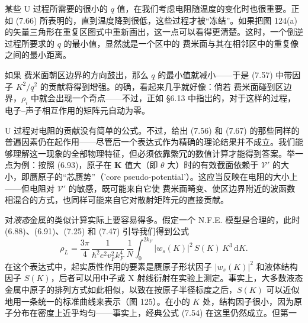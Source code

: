 某些 U 过程所需要的很小的 $q$ 值，在我们考虑电阻随温度的变化时也很重要。正如 (7.66) 所表明的，直到温度降到很低，这些过程才被“冻结”。如果把图 124(a) 的矢量三角形在重复区图式中重新画出，这一点可以看得更清楚。这时，一个倒逆过程所要求的 $q$ 的最小值，显然就是一个区中的 费米面与其在相邻区中的重复像之间的最小距离。


如果 费米面朝区边界的方向鼓出，那么 $q$ 的最小值就减小——于是 (7.57) 中带因子 $K^{2}/q^{2}$ 的贡献将得到增强。的确，看起来几乎就好像：倘若 费米面碰到区边界，$\rho_{i}$ 中就会出现一个奇点——不过，正如 §6.13 中指出的，对于这样的过程，电子--声子相互作用的矩阵元自动为零。

U 过程对电阻的贡献没有简单的公式。不过，给出 (7.56) 和 (7.67) 的那些同样的普遍因素仍在起作用——尽管后一个表达式作为精确的理论结果并不成立。我们能够理解这一现象的全部物理特征，但必须依靠繁冗的数值计算才能得到答案。举一点为例：按照 (6.93)，原子在 $\mathbf{K}$ 值大（即 $\theta$ 大）时的有效截面依赖于 $\mathcal{V}'$ 的大小，即赝原子的“芯赝势”（'core pseudo-potential'）。这应当反映在电阻的大小上——但电阻对 $\mathcal{V}'$ 的敏感，既可能来自它使 费米面畸变、使区边界附近的波函数相混合的方式，也同样可能来自它对散射矩阵元的直接贡献。


对\emph{液态}金属的类似计算实际上要容易得多。假定一个 N.F.E. 模型是合理的，此时 (6.88)、(6.91)、(7.25) 和 (7.47) 引导我们得到公式
\begin{equation*}
\rho_{L}=\frac{3\pi}{4}\,\frac{1}{\hbar^{2}e^{2}v_{F}^{2}k_{F}^{4}}\,\frac{1}{N}\int_{0}^{2k_{F}}|w_{s}(K)|^{2}\,S(K)\,K^{3}\,\mathrm{d}K.\tag{7.72}
\end{equation*}
在这个表达式中，起实质性作用的要素是赝原子形状因子 $|w_{s}(K)|^{2}$ 和液体结构因子 $S(K)$，后者可以用中子或 X 射线衍射在实验上测定。事实上，大多数液态金属中原子的排列方式如此相似，以致在按原子半径标度之后，$S(K)$ 可以近似地用一条统一的标准曲线来表示（图 125）。在小的 $K$ 处，结构因子很小，因为原子分布在密度上近乎均匀——事实上，经典公式 (7.54) 在这里仍然成立。但第一
